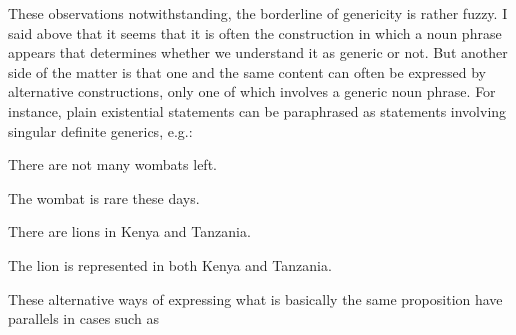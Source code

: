 \begin{styleBodyTextFirst}
These observations notwithstanding, the borderline of genericity is rather fuzzy. I said above that it seems that it is often the construction in which a noun phrase appears that determines whether we understand it as generic or not. But another side of the matter is that one and the same content can often be expressed by alternative constructions, only one of which involves a generic noun phrase. For instance, plain existential statements can be paraphrased as statements involving singular definite generics, e.g.:

\end{styleBodyTextFirst}

\begin{listWWNumileveli}
\item {}

\begin{styleExample}
There are not many wombats left.

\end{styleExample}

\item {}

\begin{styleExample}
The wombat is rare these days.

\end{styleExample}

\item {}

\begin{styleExample}
There are lions in Kenya and Tanzania.

\end{styleExample}

\item {}

\begin{styleExample}
The lion is represented in both Kenya and Tanzania. 

\end{styleExample}

\end{listWWNumileveli}

\begin{styleBodyTextFirst}
These alternative ways of expressing what is basically the same proposition have parallels in cases such as

\end{styleBodyTextFirst}

